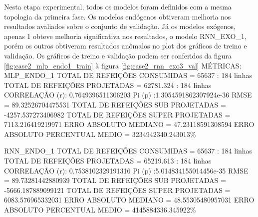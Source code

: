 \documentclass[	12pt, Times, openright, twoside, a4paper, english, brazil]{abntex2}
\begin{document}
    	    Nesta etapa experimental, todos os modelos foram definidos com a mesma topologia da primeira fase.
    	    Os modelos endógenos obtiveram melhoria nos resultados avaliados sobre o conjunto de validação.
    	    Já os modelos exógenos, apenas 1 obteve melhoria significativa nos resultados, o modelo RNN\_EXO\_1, porém os outros obtiveram resultados anômalos no plot dos gráficos de treino e validação.
    	    Os gráficos de treino e validação podem ser conferidos da figura \ref{fig:case2_mlp_endo1_train} à figura \ref{fig:case2_rnn_exo3_val}
    	    MÉTRICAS:\newline
    	    MLP\_ENDO\_1 \newline
            TOTAL DE REFEIÇÕES CONSUMIDAS = 65637 : 184 linhas\newline
            TOTAL DE REFEIÇÕES PROJETADAS = 62781.324 : 184 linhas\newline
            CORRELAÇÃO (r): 0.7649396511306203 Pi (p) :1.3054591862307924e-36\newline
            RMSE = 89.32526704475531\newline
            TOTAL DE REFEIÇÕES SUB PROJETADAS = -4257.537273406982\newline
            TOTAL DE REFEIÇÕES SUPER PROJETADAS = 7113.216419219971\newline
            ERRO ABSOLUTO MEDIANO = 47.23118591308594\newline
            ERRO ABSOLUTO PERCENTUAL MEDIO = 3234942340.243013\% \newline
            
            RNN\_ENDO\_1\newline
            TOTAL DE REFEIÇÕES CONSUMIDAS = 65637 : 184 linhas\newline
            TOTAL DE REFEIÇÕES PROJETADAS = 65219.613 : 184 linhas\newline
            CORRELAÇÃO (r): 0.7538102329191316 Pi (p) :5.014834155014456e-35\newline
            RMSE = 89.73281442880939\newline
            TOTAL DE REFEIÇÕES SUB PROJETADAS = -5666.187889099121\newline
            TOTAL DE REFEIÇÕES SUPER PROJETADAS = 6083.576965332031\newline
            ERRO ABSOLUTO MEDIANO = 48.55305480957031\newline
            ERRO ABSOLUTO PERCENTUAL MEDIO = 4145884336.345922\% \newline
            
\end{document}
